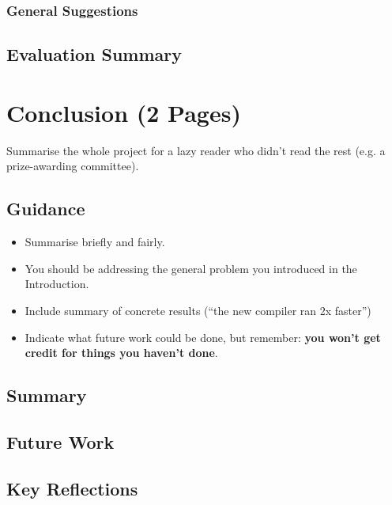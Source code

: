 \documentclass{l4proj}
\begin{document}
\subsection{General Suggestions}

\section{Evaluation Summary}

\chapter{Conclusion (2 Pages)}
Summarise the whole project for a lazy reader who didn't read the rest (e.g. a prize-awarding committee).
\section{Guidance}
\begin{itemize}
    \item
          Summarise briefly and fairly.
    \item
          You should be addressing the general problem you introduced in the
          Introduction.
    \item
          Include summary of concrete results (``the new compiler ran 2x
          faster'')
    \item
          Indicate what future work could be done, but remember: \textbf{you
              won't get credit for things you haven't done}.
\end{itemize}

\section{Summary}

\section{Future Work}

\section{Key Reflections}

%
% 
\end{document}
